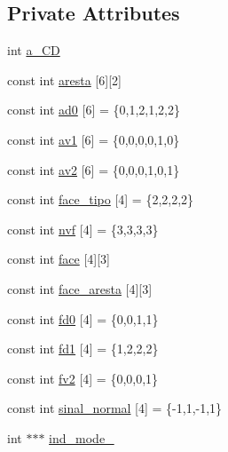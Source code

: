 \subsection*{Private Attributes}
\begin{DoxyCompactItemize}
\item 
int \hyperlink{classTetrahedral_ae9100969833b3215945261766992c702}{a\+\_\+\+CD}
\item 
const int \hyperlink{classTetrahedral_a8b15407c8a0a1e67fb9dd5db6d8b8cff}{aresta} \mbox{[}6\mbox{]}\mbox{[}2\mbox{]}
\item 
const int \hyperlink{classTetrahedral_ae9f066e7b669b78adf0736e3a6271564}{ad0} \mbox{[}6\mbox{]} = \{0,1,2,1,2,2\}
\item 
const int \hyperlink{classTetrahedral_a3e50a0017016ecd4213313f3ac9ce8c0}{av1} \mbox{[}6\mbox{]} = \{0,0,0,0,1,0\}
\item 
const int \hyperlink{classTetrahedral_ae82fd07d8240a433ef8d7772975a99a1}{av2} \mbox{[}6\mbox{]} = \{0,0,0,1,0,1\}
\item 
const int \hyperlink{classTetrahedral_a83b0685a10e8487617ddfe1e5ce28d36}{face\+\_\+tipo} \mbox{[}4\mbox{]} = \{2,2,2,2\}
\item 
const int \hyperlink{classTetrahedral_a125bebfad5bc1c6577425cc24e287caf}{nvf} \mbox{[}4\mbox{]} = \{3,3,3,3\}
\item 
const int \hyperlink{classTetrahedral_a3acfd46f1a82598f1c414ed2b943c27b}{face} \mbox{[}4\mbox{]}\mbox{[}3\mbox{]}
\item 
const int \hyperlink{classTetrahedral_a4c77419317e33dbe6defe1a0165e6cfa}{face\+\_\+aresta} \mbox{[}4\mbox{]}\mbox{[}3\mbox{]}
\item 
const int \hyperlink{classTetrahedral_a7017ed9b075be3d84ca11ae8c5bb77d2}{fd0} \mbox{[}4\mbox{]} = \{0,0,1,1\}
\item 
const int \hyperlink{classTetrahedral_ade492a6b9a7f709f4ff8a3cbb42a3bc5}{fd1} \mbox{[}4\mbox{]} = \{1,2,2,2\}
\item 
const int \hyperlink{classTetrahedral_ad6660190f9c669a2f2ae965be793a3e9}{fv2} \mbox{[}4\mbox{]} = \{0,0,0,1\}
\item 
const int \hyperlink{classTetrahedral_a10d388d6aa888355aff368370cf19cce}{sinal\+\_\+normal} \mbox{[}4\mbox{]} = \{-\/1,1,-\/1,1\}
\item 
int $\ast$$\ast$$\ast$ \hyperlink{classTetrahedral_a616962833d192dcd2502d490c492a4ef}{ind\+\_\+mode\+\_\+}
\end{DoxyCompactItemize}


